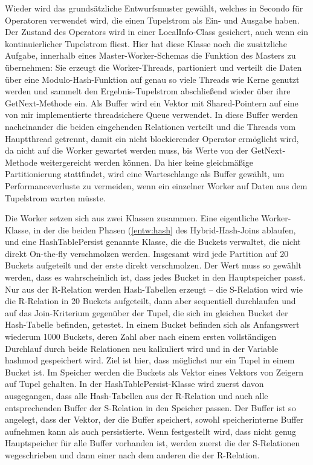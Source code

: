 \documentclass[a4paper,12pt,twoside]{article}
\begin{document}
Wieder wird das grundsätzliche Entwurfsmuster gewählt, welches in Secondo für Operatoren verwendet wird, die einen Tupelstrom als Ein- und Ausgabe haben. Der Zustand des Operators wird in einer LocalInfo-Class gesichert, auch wenn ein kontinuierlicher Tupelstrom fliest. Hier hat diese Klasse noch die zusätzliche Aufgabe, innerhalb eines Master-Worker-Schemas die Funktion des Masters zu übernehmen: Sie erzeugt die Worker-Threads, partioniert und verteilt die Daten über eine Modulo-Hash-Funktion auf genau so viele Threads wie Kerne genutzt werden und sammelt den Ergebnis-Tupelstrom abschließend wieder über ihre GetNext-Methode ein. Als Buffer wird ein Vektor mit Shared-Pointern auf eine von mir implementierte threadsichere Queue verwendet. In diese Buffer werden nacheinander die beiden eingehenden Relationen verteilt und die Threads vom Hauptthread getrennt, damit ein nicht blockierender Operator ermöglicht wird, da nicht auf die Worker gewartet werden muss, bis Werte von der GetNext-Methode weitergereicht werden können. Da hier keine gleichmäßige Partitionierung stattfindet, wird eine Warteschlange als Buffer gewählt, um Performanceverluste zu vermeiden, wenn ein einzelner Worker auf Daten aus dem Tupelstrom warten müsste.

Die Worker setzen sich aus zwei Klassen zusammen. Eine eigentliche Worker-Klasse, in der die beiden Phasen (\autoref{entw:hash} des Hybrid-Hash-Joins ablaufen, und eine HashTablePersist genannte Klasse, die die Buckets verwaltet, die nicht direkt On-the-fly verschmolzen werden. Insgesamt wird jede Partition auf 20 Buckets aufgeteilt und der erste direkt verschmolzen. Der Wert muss so gewählt werden, dass es wahrscheinlich ist, dass jedes Bucket in den Hauptspeicher passt. Nur aus der R-Relation werden Hash-Tabellen erzeugt -- die S-Relation wird wie die R-Relation in 20 Buckets aufgeteilt, dann aber sequentiell durchlaufen und auf das Join-Kriterium gegenüber der Tupel, die sich im gleichen Bucket der Hash-Tabelle befinden, getestet. In einem Bucket befinden sich als Anfangswert wiederum 1000 Buckets, deren Zahl aber nach einem ersten vollständigen Durchlauf durch beide Relationen neu kalkuliert wird und in der Variable hashmod gespeichert wird. Ziel ist hier, dass möglichst nur ein Tupel in einem Bucket ist. Im Speicher werden die Buckets als Vektor eines Vektors von Zeigern auf Tupel gehalten. In der HashTablePersist-Klasse wird zuerst davon ausgegangen, dass alle Hash-Tabellen aus der R-Relation und auch alle entsprechenden Buffer der S-Relation in den Speicher passen. Der Buffer ist so angelegt, dass der Vektor, der die Buffer speichert, sowohl speicherinterne Buffer aufnehmen kann als auch persistierte. Wenn festgestellt wird, dass nicht genug Hauptspeicher für alle Buffer vorhanden ist, werden zuerst die der S-Relationen wegeschrieben und dann einer nach dem anderen die der R-Relation.
\end{document}
